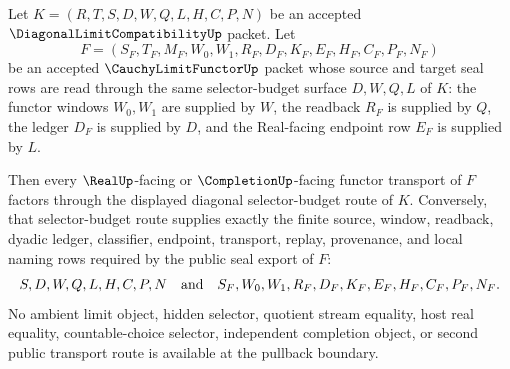 \begin{theorem}
\label{thm:diagonal-limit-selector-budget-cauchy-limit-functor-pullback}
Let $K=(R,T,S,D,W,Q,L,H,C,P,N)$ be an accepted $\DiagonalLimitCompatibilityUp$ packet. Let
$$
F=(S_F,T_F,M_F,W_0,W_1,R_F,D_F,K_F,E_F,H_F,C_F,P_F,N_F)
$$
be an accepted $\CauchyLimitFunctorUp$ packet whose source and target seal rows are read through the same selector-budget surface $D,W,Q,L$ of $K$: the functor windows $W_0,W_1$ are supplied by $W$, the readback $R_F$ is supplied by $Q$, the ledger $D_F$ is supplied by $D$, and the Real-facing endpoint row $E_F$ is supplied by $L$.

Then every $\RealUp$-facing or $\CompletionUp$-facing functor transport of $F$ factors through the displayed diagonal selector-budget route of $K$. Conversely, that selector-budget route supplies exactly the finite source, window, readback, dyadic ledger, classifier, endpoint, transport, replay, provenance, and local naming rows required by the public seal export of $F$:
$$
S,D,W,Q,L,H,C,P,N
\quad\hbox{and}\quad
S_F,W_0,W_1,R_F,D_F,K_F,E_F,H_F,C_F,P_F,N_F .
$$
No ambient limit object, hidden selector, quotient stream equality, host real equality, countable-choice selector, independent completion object, or second public transport route is available at the pullback boundary.
\end{theorem}
